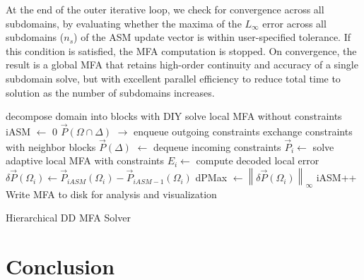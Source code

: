 \documentclass[conference]{IEEEtran}
\newcommand{\Remark}[1]{{\color{RED}\sf Remark: {#1}}}
\newcommand{\algo}[1]{Algorithm~(\ref{#1})}
\begin{document}
At the end of the outer iterative loop, we check for convergence across all subdomains, by evaluating whether the maxima of the $L_{\infty}$ error across all subdomains ($n_s$) of the ASM update vector is within user-specified tolerance. If this condition is satisfied, the MFA computation is stopped.
On convergence, the result is a global MFA that retains high-order continuity and accuracy of a single subdomain solve, but with excellent parallel efficiency to reduce total time to solution as the number of subdomains increases.



\begin{algorithm}
	\DontPrintSemicolon
	decompose domain into blocks with DIY\;
	solve local MFA without constraints\;
	\;
	iASM $\leftarrow$ 0 
	{
		$\vec{P}(\Omega \cap \Delta)$ $\rightarrow$ enqueue outgoing constraints\;
		exchange constraints with neighbor blocks\;
		$\vec{P}(\Delta)$ $\leftarrow$ dequeue incoming constraints\;
		\;
		{
			$\vec{P}_i \leftarrow$ solve adaptive local MFA with constraints\;
			$E_i \leftarrow$ compute decoded local error\;
			$\delta \vec{P} (\Omega_i) \leftarrow \vec{P}_{iASM} (\Omega_i) - \vec{P}_{iASM-1} (\Omega_i)$\;
		}
		dPMax $\leftarrow \left\lVert \delta \vec{P} (\Omega_i) \right\rVert_{\infty}$\;
		iASM++\;
	}
	\;
    Write MFA to disk for analysis and visualization
	\caption{Hierarchical DD MFA Solver}
	\label{alg:pseudocode}
\end{algorithm}



\section{Conclusion}
\end{document}
